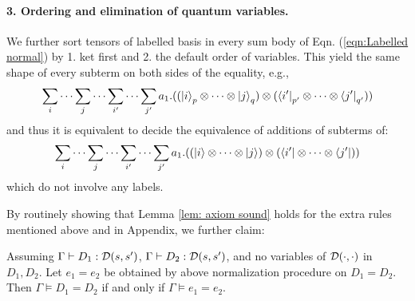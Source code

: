 \paragraph*{3. Ordering and elimination of quantum variables.} 
We further sort tensors of labelled basis in every sum body of Eqn. (\ref{eqn:Labelled normal}) by 1. ket first and 2. the default order of variables. This yield the same shape of every subterm on both sides of the equality, e.g., 
\begin{equation*}
  \sum_{i}\cdots\sum_{j}\cdots \sum_{i'}\cdots\sum_{j'} a_1 . ((\ket{i}_p \otimes \cdots \otimes \ket{j}_q) \otimes (\bra{i'}_{p'}\otimes\cdots\otimes \bra{j'}_{q'}))
\end{equation*}
and thus it is equivalent to decide the equivalence of additions of subterms of:
\begin{equation*}
  \sum_{i}\cdots\sum_{j}\cdots \sum_{i'}\cdots\sum_{j'} a_1 . ((\ket{i} \otimes \cdots \otimes \ket{j}) \otimes (\bra{i'}\otimes\cdots\otimes \bra{j'}))
\end{equation*}
which do not involve any labels. 


By routinely showing that Lemma \ref{lem: axiom sound} holds for the extra rules mentioned above and in Appendix, we further claim:
\begin{theorem}
  Assuming $\Gamma\vdash D_1 : {\mathcal{D}}(s,s')$, $\Gamma\vdash D_2 : {\mathcal{D}}(s,s')$, 
  and no variables of $\mathcal{D}(\cdot,\cdot)$ in $D_1,D_2$.
  Let $e_1 = e_2$ be obtained by above normalization procedure on $D_1 = D_2$. Then $\Gamma\vDash D_1 = D_2$ if and only if $\Gamma\vDash e_1 = e_2$.
\end{theorem}

